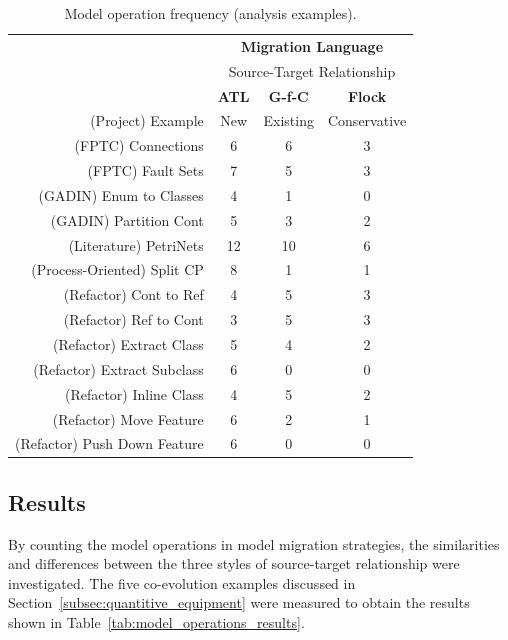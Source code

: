 \begin{table}[tbp]
	\centering
	\begin{tabular}{|r|c|c|c|}
		\hline
		                              & \multicolumn{3}{|c|}{\textbf{Migration Language}} \\
													  			& \multicolumn{3}{|c|}{Source-Target Relationship} \\
		\hline
		                              & \textbf{ATL} & \textbf{G-f-C} & \textbf{Flock} \\
		(Project) Example             & New & Existing & Conservative \\
		\hline
		\hline
		(FPTC) Connections            & 6  & 6   & 3  \\
		\hline
		(FPTC) Fault Sets             & 7  & 5   & 3  \\
		\hline
		(GADIN) Enum to Classes       & 4  & 1   & 0  \\
		\hline
		(GADIN) Partition Cont        & 5  & 3   & 2  \\
		\hline
		(Literature) PetriNets        & 12  & 10   & 6  \\
		\hline
		(Process-Oriented) Split CP   & 8  & 1   & 1  \\
		\hline
		(Refactor) Cont to Ref        & 4  & 5   & 3  \\
		\hline
		(Refactor) Ref to Cont        & 3  & 5   & 3  \\
		\hline
		(Refactor) Extract Class      & 5  & 4   & 2  \\
		\hline
		(Refactor) Extract Subclass   & 6  & 0   & 0  \\
		\hline
		(Refactor) Inline Class       & 4  & 5   & 2  \\
		\hline
		(Refactor) Move Feature       & 6  & 2   & 1  \\
		\hline
		(Refactor) Push Down Feature  & 6  & 0 & 0  \\
		\hline
	\end{tabular}
	\caption{Model operation frequency (analysis examples).}
	\label{tab:model_operations_results_analysis_examples}
\end{table}

\subsection{Results}
\label{subsec:quantitive_results}
By counting the model operations in model migration strategies, the similarities and differences between the three styles of source-target relationship were investigated. The five co-evolution examples discussed in Section~\ref{subsec:quantitive_equipment} were measured to obtain the results shown in Table~\ref{tab:model_operations_results}.

